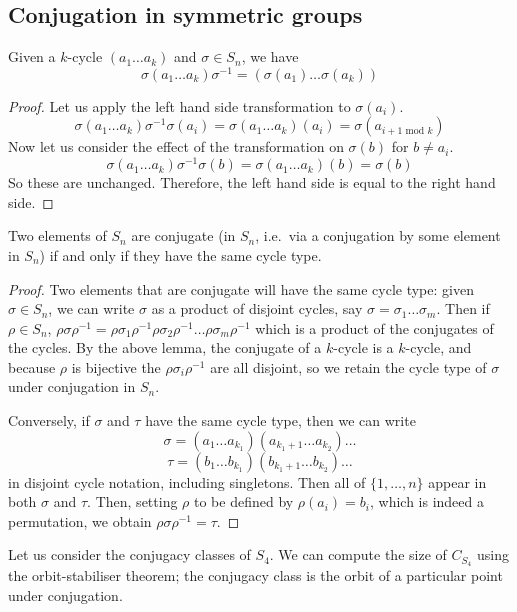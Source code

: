 \subsection{Conjugation in symmetric groups}
\begin{lemma}
	Given a \(k\)-cycle \((a_1\dots a_k)\) and \(\sigma \in S_n\), we have
	\[
		\sigma (a_1\dots a_k) \sigma^{-1} = (\sigma(a_1)\dots \sigma(a_k))
	\]
\end{lemma}
\begin{proof}
	Let us apply the left hand side transformation to \(\sigma(a_i)\).
	\[
		\sigma (a_1\dots a_k) \sigma^{-1} \sigma(a_i) = \sigma (a_1\dots a_k) (a_i) = \sigma(a_{i+1\text{ mod } k})
	\]
	Now let us consider the effect of the transformation on \(\sigma(b)\) for \(b \neq a_i\).
	\[
		\sigma (a_1\dots a_k) \sigma^{-1} \sigma(b) = \sigma (a_1\dots a_k) (b) = \sigma(b)
	\]
	So these are unchanged.
	Therefore, the left hand side is equal to the right hand side.
\end{proof}

\begin{proposition}
	Two elements of \(S_n\) are conjugate (in \(S_n\), i.e.\ via a conjugation by some element in \(S_n\)) if and only if they have the same cycle type.
\end{proposition}
\begin{proof}
	Two elements that are conjugate will have the same cycle type: given \(\sigma \in S_n\), we can write \(\sigma\) as a product of disjoint cycles, say \(\sigma = \sigma_1\dots\sigma_m\).
	Then if \(\rho \in S_n\), \(\rho \sigma \rho^{-1} = \rho \sigma_1 \rho^{-1} \rho \sigma_2 \rho^{-1} \dots \rho \sigma_m \rho^{-1}\) which is a product of the conjugates of the cycles.
	By the above lemma, the conjugate of a \(k\)-cycle is a \(k\)-cycle, and because \(\rho\) is bijective the \(\rho \sigma_i \rho^{-1}\) are all disjoint, so we retain the cycle type of \(\sigma\) under conjugation in \(S_n\).

	Conversely, if \(\sigma\) and \(\tau\) have the same cycle type, then we can write
	\[
		\sigma = (a_1\dots a_{k_1})(a_{k_1+1}\dots a_{k_2})\dots
	\]
	\[
		\tau = (b_1\dots b_{k_1})(b_{k_1+1}\dots b_{k_2})\dots
	\]
	in disjoint cycle notation, including singletons.
	Then all of \(\{ 1, \dots, n \}\) appear in both \(\sigma\) and \(\tau\).
	Then, setting \(\rho\) to be defined by \(\rho(a_i) = b_i\), which is indeed a permutation, we obtain \(\rho\sigma\rho^{-1}=\tau\).
\end{proof}
Let us consider the conjugacy classes of \(S_4\).
We can compute the size of \(C_{S_4}\) using the orbit-stabiliser theorem; the conjugacy class is the orbit of a particular point under conjugation.

